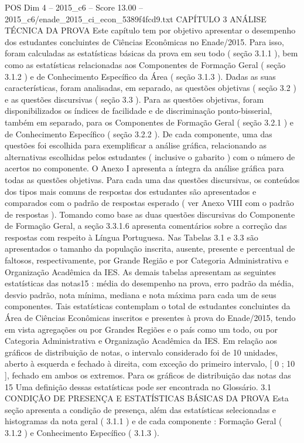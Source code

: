 \begin{textsample}{POS Dim 4 – 2015\_c6 – Score 13.00 – 2015\_c6/enade\_2015\_ci\_econ\_5389f4fcd9.txt}  \label{ex:f4_pos_027}
CAPÍTULO 3 ANÁLISE TÉCNICA DA PROVA Este capítulo tem por objetivo apresentar o desempenho dos estudantes concluintes de Ciências Econômicas no Enade/2015.
Para isso, foram calculadas as estatísticas básicas da prova em seu todo ( seção 3.1.1 ), bem como as estatísticas relacionadas aos Componentes de Formação Geral ( seção 3.1.2 ) e de Conhecimento Específico da Área ( seção 3.1.3 ).
Dadas as suas características, foram analisadas, em separado, as questões objetivas ( seção 3.2 ) e as questões discursivas ( seção 3.3 ).
Para as questões objetivas, foram disponibilizados os índices de facilidade e de discriminação ponto-bisserial, também em separado, para os Componentes de Formação Geral ( seção 3.2.1 ) e de Conhecimento Específico ( seção 3.2.2 ).
De cada componente, uma das questões foi escolhida para exemplificar a análise gráfica, relacionando as alternativas escolhidas pelos estudantes ( inclusive o gabarito ) com o número de acertos no componente.
O Anexo I apresenta a íntegra da análise gráfica para todas as questões objetivas.
Para cada uma das questões discursivas, os conteúdos dos tipos mais comuns de respostas dos estudantes são apresentados e comparados com o padrão de respostas esperado ( ver Anexo VIII com o padrão de respostas ).
Tomando como base as duas questões discursivas do Componente de Formação Geral, a seção 3.3.1.6 apresenta comentários sobre a correção das respostas com respeito à Língua Portuguesa.
Nas Tabelas 3.1 e 3.3 são apresentados o tamanho da população inscrita, ausente, presente e percentual de faltosos, respectivamente, por Grande Região e por Categoria Administrativa e Organização Acadêmica da IES.
As demais tabelas apresentam as seguintes estatísticas das notas15 : média do desempenho na prova, erro padrão da média, desvio padrão, nota mínima, mediana e nota máxima para cada um de seus componentes.
Tais estatísticas contemplam o total de estudantes concluintes da Área de Ciências Econômicas inscritos e presentes à prova do Enade/2015, tendo em vista agregações ou por Grandes Regiões e o país como um todo, ou por Categoria Administrativa e Organização Acadêmica da IES.
Em relação aos gráficos de distribuição de notas, o intervalo considerado foi de 10 unidades, aberto à esquerda e fechado à direita, com exceção do primeiro intervalo, [ 0 ; 10 ], fechado em ambos os extremos.
Para os gráficos de distribuição das notas das 15 Uma definição dessas estatísticas pode ser encontrada no Glossário. 3.1 CONDIÇÃO DE PRESENÇA E ESTATÍSTICAS BÁSICAS DA PROVA Esta seção apresenta a condição de presença, além das estatísticas selecionadas e histogramas da nota geral ( 3.1.1 ) e de cada componente : Formação Geral ( 3.1.2 ) e Conhecimento Específico ( 3.1.3 ).

\end{textsample}
